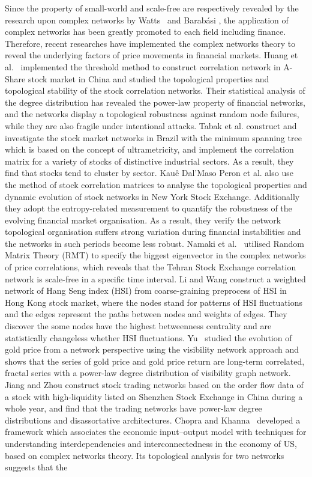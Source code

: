 Since the property of small-world and scale-free are respectively revealed by the research upon complex networks by Watts~\cite{watts1998collective} and Barab{\'a}si \cite{barabasi1999emergence}, the application of complex networks has been greatly promoted to each field including finance. Therefore, recent researches have implemented the complex networks theory to reveal the underlying factors of price movements in financial markets. Huang et al.~\cite{chinesenetwork} implemented the threshold method to construct correlation network in A-Share stock market in China and studied the topological properties and topological stability of the stock correlation networks. Their statistical analysis of the degree distribution has revealed the power-law property of financial networks, and the networks display a topological robustness against random node failures, while they are also fragile under intentional attacks. Tabak et al. \cite{tabak2010topological} construct and investigate the stock market networks in Brazil with the minimum spanning tree which is based on the concept of ultrametricity, and implement the correlation matrix for a variety of stocks of distinctive industrial sectors. As a result, they find that stocks tend to cluster by sector. Kau{\^e} Dal’Maso Peron et al. \cite{kaue2012structure} also use the method of stock correlation matrices to analyse the topological properties and dynamic evolution of stock networks in New York Stock Exchange. Additionally they adopt the entropy-related measurement to quantify the robustness of the evolving financial market organisation. As a result, they verify the network topological organisation suffers strong variation during financial instabilities and the networks in such periods become less robust. Namaki et al.~\cite{genuine} utilised Random Matrix Theory (RMT) to specify the biggest eigenvector in the complex networks of price correlations, which reveals that the Tehran Stock Exchange correlation network is scale-free in a specific time interval. Li and Wang \cite{li2007extracting} construct a weighted network of Hang Seng index (HSI) from coarse-graining preprocess of HSI in Hong Kong stock market, where the nodes stand for patterns of HSI fluctuations and the edges represent the paths between nodes and weights of edges. They discover the some nodes have the highest betweenness centrality and are statistically changeless whether HSI fluctuations. Yu~\cite{visibility} studied the evolution of gold price from a network perspective using the visibility network approach and shows that the series of gold price and gold price return are long-term correlated, fractal series with a power-law degree distribution of visibility graph network. Jiang and Zhou \cite{jiang2010complex} construct stock trading networks based on the order flow data of a stock with high-liquidity listed on Shenzhen Stock Exchange in China during a whole year, and find that the trading networks have power-law degree distributions and disassortative architectures. Chopra and Khanna~\cite{intercd} developed a framework which associates the economic input–output model with techniques for understanding interdependencies and interconnectedness in the economy of US, based on complex networks theory. Its topological analysis for two networks suggests that the 